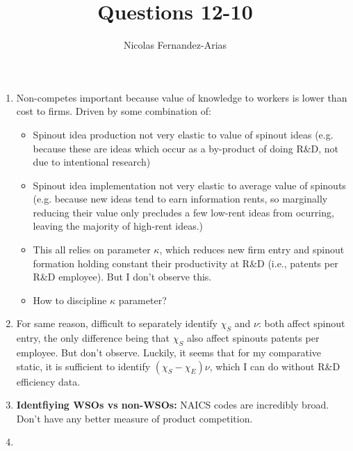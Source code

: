 \documentclass[12pt,english]{article}
\theoremstyle{remark}
\begin{document}
	
\title{Questions 12-10}
\author{Nicolas Fernandez-Arias}
\maketitle


\begin{enumerate}
	\item Non-competes important because value of knowledge to workers is lower than cost to firms. Driven by some combination of:
	\begin{itemize}
		\item Spinout idea production not very elastic to value of spinout ideas (e.g. because these are ideas which occur as a by-product of doing R\&D, not due to intentional research)
		\item Spinout idea implementation not very elastic to average value of spinouts (e.g. because new ideas tend to earn information rents, so marginally reducing their value only precludes a few low-rent ideas from ocurring, leaving the majority of high-rent ideas.)
		\item This all relies on parameter $\kappa$, which reduces new firm entry and spinout formation holding constant their productivity at R\&D (i.e., patents per R\&D employee). But I don't observe this.
		\item How to discipline $\kappa$ parameter?
	\end{itemize}
	\item For same reason, difficult to separately identify $\chi_S$ and $\nu$: both affect spinout entry, the only difference being that $\chi_S$ also affect spinouts patents per employee. But don't observe. Luckily, it seems that for my comparative static, it is sufficient to identify $(\chi_S - \chi_E)\nu$, which I can do without R\&D efficiency data.
	\item \textbf{Identfiying WSOs vs non-WSOs: }NAICS codes are incredibly broad. Don't have any better measure of product competition. 
	\item 
\end{enumerate}
\end{document}
